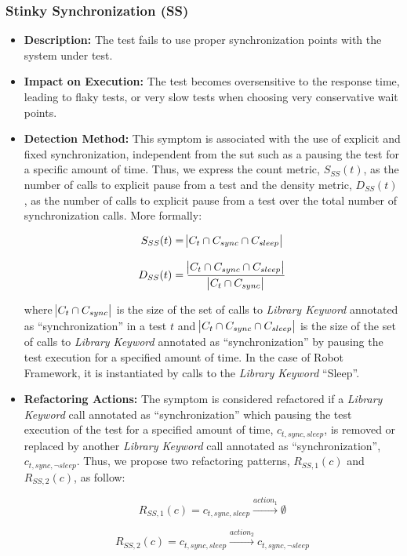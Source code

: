\subsubsection{Stinky Synchronization (SS)}

\begin{itemize}
    \item \textbf{Description:} The test fails to use proper synchronization points with the system under test.

    \item \textbf{Impact on Execution:} The test becomes oversensitive to the response time, leading to flaky tests, or very slow tests when choosing very conservative wait points.
    
    \item \textbf{Detection Method:} This symptom is associated with the use of explicit and fixed synchronization, independent from the \gls{sut} such as a pausing the test for a specific amount of time. Thus, we express the count metric, $S_{SS}(t)$, as the number of calls to explicit pause from a test and the density metric, $D_{SS}(t)$, as the number of calls to explicit pause from a test over the total number of synchronization calls. More formally:
    
    \begin{equation*}
        S_{SS}(t) = \abs{C_{t} \cap C_{sync} \cap C_{sleep}}
    \end{equation*}
    
    \begin{equation*}
        D_{SS}(t) = \frac{\abs{C_{t} \cap C_{sync} \cap C_{sleep}}}{\abs{C_{t} \cap C_{sync}}}
    \end{equation*}
    
    where $\abs{C_{t} \cap C_{sync}}$ is the size of the set of calls to \emph{Library Keyword} annotated as ``synchronization'' in a test $t$ and $\abs{C_{t} \cap C_{sync} \cap C_{sleep}}$ is the size of the set of calls to \emph{Library Keyword} annotated as ``synchronization'' by pausing the test execution for a specified amount of time. In the case of Robot Framework, it is instantiated by calls to the \emph{Library Keyword} ``Sleep''.
    
    \item \textbf{Refactoring Actions:} The symptom is considered refactored if a \emph{Library Keyword} call annotated as ``synchronization'' which pausing the test execution of the test for a specified amount of time, $c_{t,sync,sleep}$, is removed or replaced by another \emph{Library Keyword} call annotated as ``synchronization'', $c_{t,sync, \neg sleep}$. Thus, we propose two refactoring patterns, $R_{SS, 1}(c)$ and $R_{SS, 2}(c)$, as follow:
    
    \begin{equation*}
        R_{SS, 1}(c) = c_{t,sync,sleep} \xrightarrow{action_1} \emptyset
    \end{equation*}
    
    \begin{equation*}
        R_{SS,2}(c) = c_{t,sync,sleep} \xrightarrow{action_2} c_{t,sync, \neg sleep}
    \end{equation*}
\end{itemize}

